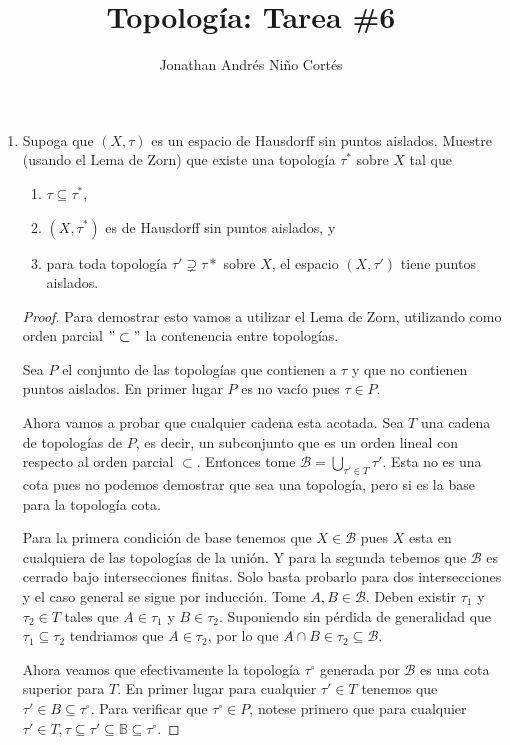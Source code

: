 \documentclass[letter,twoside,12pt]{article}
\title{Topología: Tarea \#6}
\author{Jonathan Andrés Niño Cortés}
\begin{document}
\maketitle

\begin{enumerate}
\item Supoga que $ (X , \tau) $ es un espacio de Hausdorff sin puntos aislados. Muestre (usando el Lema de Zorn) que existe una topología $ \tau^* $ sobre $ X $ tal que

\begin{enumerate}
\item $ \tau \subseteq \tau^* $,
\item $ (X, \tau^*) $ es de Hausdorff sin puntos aislados, y
\item para toda topología $ \tau' \supsetneq \tau* $ sobre $ X $, el espacio $ (X,\tau') $ tiene puntos aislados. 
\end{enumerate}
\begin{proof}
Para demostrar esto vamos a utilizar el Lema de Zorn, utilizando como orden parcial $ "\subset" $ la contenencia entre topologías.

Sea $ P $ el conjunto de las topologías que contienen a $ \tau $ y que no contienen puntos aislados. En primer lugar $ P $ es no vacío pues $ \tau \in P$. 

Ahora vamos a probar que cualquier cadena esta acotada. Sea $ T $ una cadena de topologías de $ P $, es decir, un subconjunto que es un orden lineal con respecto al orden parcial $ \subset $. Entonces tome $ \mathcal{B} = \bigcup_{\tau' \in T} \tau' $. Esta no es una cota pues no podemos demostrar que sea una topología, pero si es la base para la topología cota.

Para la primera condición de base tenemos que $ X \in \mathcal{B} $ pues $X$ esta en cualquiera de las topologías de la unión. Y para la segunda tebemos que $ \mathcal{B} $ es cerrado bajo  intersecciones finitas. Solo basta probarlo para dos intersecciones y el caso general se sigue por inducción.  Tome $ A , B \in \mathcal{B} $. Deben existir $ \tau_1 $ y $ \tau_2 \in T $ tales que $A \in \tau_1 $ y $ B \in \tau_2 $. Suponiendo sin pérdida de generalidad que $ \tau_1 \subseteq \tau_2 $ tendriamos que $ A \in \tau_2 $, por lo que $ A \cap B \in \tau_2 \subseteq \mathcal{B} $.

Ahora veamos que efectivamente la topología $ \tau^{\circ} $ generada por $ \mathcal{B} $ es una cota superior para $ T $. En primer lugar para cualquier $ \tau' \in T $ tenemos que $ \tau' \in B \subseteq \tau^{\circ} $. Para verificar que $ \tau^{\circ} \in P $, notese primero que para cualquier $ \tau' \in T, \tau \subseteq \tau' \subseteq \mathbb{B} \subseteq \tau^{\circ}$.


\end{proof}
\end{enumerate}
\end{document}
